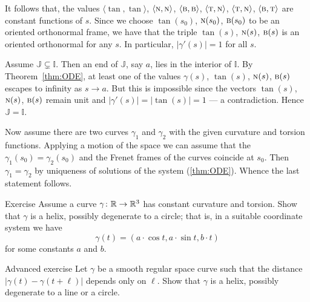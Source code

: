 It follows that, the values 
$\langle\tan,\tan\rangle$,
$\langle\text{\sc{n}},\text{\sc{n}}\rangle$,
$\langle\text{\sc{b}},\text{\sc{b}}\rangle$,
$\langle\text{\sc{t}},\text{\sc{n}}\rangle$,
$\langle\text{\sc{t}},\text{\sc{n}}\rangle$,
$\langle\text{\sc{b}},\text{\sc{t}}\rangle$
are constant functions of $s$.
Since we choose $\tan(s_0)$, $\text{\sc{n}}(s_0)$, $\text{\sc{b}}(s_0)$ to be an oriented orthonormal frame, we have that the triple $\tan(s)$, $\text{\sc{n}}(s)$, $\text{\sc{b}}(s)$ is an oriented orthonormal for any $s$. In particular, $|\gamma'(s)|=1$ for all $s$.

Assume $\mathbb{J} \varsubsetneq \mathbb{I}$. Then an end of $\mathbb{J}$, say $a$, lies in the interior of $\mathbb{I}$.
By Theorem~\ref{thm:ODE}, at least one of the values $\gamma(s)$, $\tan(s)$, $\text{\sc{n}}(s)$, $\text{\sc{b}}(s)$
escapes to infinity as $s\to a$.
But this is impossible since the vectors $\tan(s)$, $\text{\sc{n}}(s)$, $\text{\sc{b}}(s)$ remain unit and $|\gamma'(s)|=|\tan(s)|=1$ --- a contradiction.
Hence $\mathbb{J}= \mathbb{I}$.

Now assume there are two curves $\gamma_1$ and $\gamma_2$ with the given curvature and torsion functions.
Applying a motion of the space we can assume that the $\gamma_1(s_0)=\gamma_2(s_0)$ and the Frenet frames of the curves coincide at $s_0$.
Then $\gamma_1=\gamma_2$ by uniqueness of  solutions of the system (\ref{thm:ODE}).
Whence the last statement follows.
\qeds

\begin{thm}{Exercise}\label{ex:cur+tor=helix}
Assume a curve $\gamma\colon\mathbb{R}\to\mathbb{R}^3$ has constant curvature and torsion.
Show that $\gamma$ is a helix, possibly degenerate to a circle;
that is, in a suitable coordinate system we have
\[\gamma(t)=(a\cdot \cos t,a\cdot\sin t, b\cdot t)\]
for some constants $a$ and $b$.
\end{thm}


\begin{thm}{Advanced exercise}\label{ex:const-dist}
Let $\gamma$ be a smooth regular space curve such that the distance $|\gamma(t)-\gamma(t+\ell)|$ depends only on $\ell$.
Show that $\gamma$ is a helix, possibly degenerate to a line or a circle.
\end{thm}


